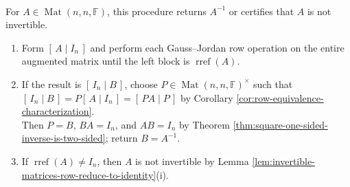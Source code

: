 \begin{computationmethod} \label{meth:augmented-inverse-computation-preview} \\
For $A\in\operatorname{Mat}(n,n,\mathbb{F})$, this procedure returns $A^{-1}$ or certifies that $A$ is not invertible.
\begin{enumerate}[label=(\roman*)]
\setlength{\itemsep}{0pt}
\item Form $[\,A\mid I_n\,]$ and perform each Gauss--Jordan row operation on the entire augmented matrix until the left block is $\operatorname{rref}(A)$.
\item If the result is $[\,I_n\mid B\,]$, choose $P\in\operatorname{Mat}(n,n,\mathbb{F})^{\times}$ such that $[\,I_n\mid B\,]=P[\,A\mid I_n\,]=[\,PA\mid P\,]$ by Corollary \ref{cor:row-equivalence-characterization}.\\
Then $P=B$, $BA=I_n$, and $AB=I_n$ by Theorem \ref{thm:square-one-sided-inverse-is-two-sided}; return $B=A^{-1}$.
\item If $\operatorname{rref}(A)\neq I_n$, then $A$ is not invertible by Lemma \ref{lem:invertible-matrices-row-reduce-to-identity}(i).
\end{enumerate}
\end{computationmethod}
